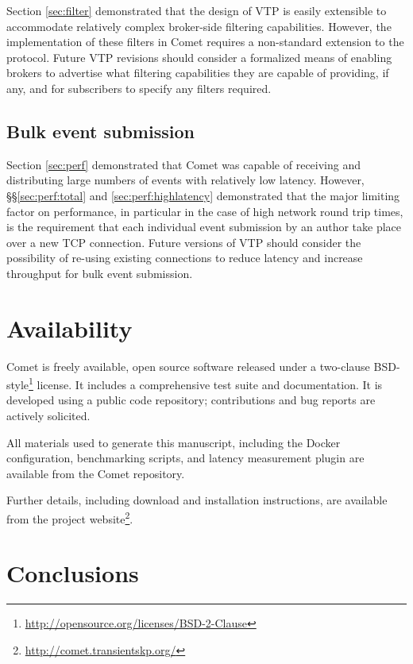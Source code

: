 \documentclass[5p,authoryear]{elsarticle}
\begin{document}
Section \ref{sec:filter} demonstrated that the design of VTP is easily
extensible to accommodate relatively complex broker-side filtering
capabilities. However, the implementation of these filters in Comet requires a
non-standard extension to the protocol. Future VTP revisions should consider a
formalized means of enabling brokers to advertise what filtering capabilities
they are capable of providing, if any, and for subscribers to specify any
filters required.

\subsection{Bulk event submission}
\label{sec:future:bulk}

Section \ref{sec:perf} demonstrated that Comet was capable of receiving and
distributing large numbers of events with relatively low latency. However,
\S\S\ref{sec:perf:total} and \ref{sec:perf:highlatency} demonstrated that
the major limiting factor on performance, in particular in the case of high
network round trip times, is the requirement that each individual event
submission by an author take place over a new TCP connection.  Future versions
of VTP should consider the possibility of re-using existing connections to
reduce latency and increase throughput for bulk event submission.

\section{Availability}
\label{sec:avail}

Comet is freely available, open source software released under a two-clause
BSD-style\footnote{\url{http://opensource.org/licenses/BSD-2-Clause}} license.
It includes a comprehensive test suite and documentation. It is developed
using a public code repository; contributions and bug reports are actively
solicited.

All materials used to generate this manuscript, including the Docker
configuration, benchmarking scripts, and latency measurement plugin are
available from the Comet repository.

Further details, including download and installation instructions, are
available from the project
website\footnote{\url{http://comet.transientskp.org/}}.

\section{Conclusions}
\label{sec:conclusions}
\end{document}
